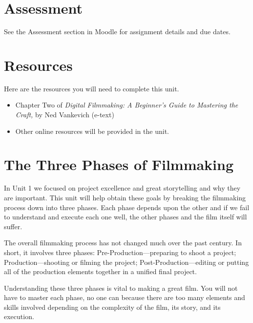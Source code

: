 \documentclass[
]{book}
\providecommand{\tightlist}{%
  \setlength{\itemsep}{0pt}\setlength{\parskip}{0pt}}
\begin{document}
\hypertarget{assessment-2}{%
\section*{Assessment}\label{assessment-2}}

See the Assessment section in Moodle for assignment details and due dates.

\hypertarget{resources-1}{%
\section*{Resources}\label{resources-1}}

Here are the resources you will need to complete this unit.

\begin{itemize}
\tightlist
\item
  Chapter Two of \emph{Digital Filmmaking: A Beginner's Guide to Mastering the Craft,} by Ned Vankevich (e-text)
\item
  Other online resources will be provided in the unit.
\end{itemize}

\hypertarget{the-three-phases-of-filmmaking}{%
\section{The Three Phases of Filmmaking}\label{the-three-phases-of-filmmaking}}

In Unit 1 we focused on project excellence and great storytelling and why they are important. This unit will help obtain these goals by breaking the filmmaking process down into three phases. Each phase depends upon the other and if we fail to understand and execute each one well, the other phases and the film itself will suffer.

The overall filmmaking process has not changed much over the past century. In short, it involves three phases: Pre-Production---preparing to shoot a project; Production---shooting or filming the project; Post-Production---editing or putting all of the production elements together in a unified final project.

Understanding these three phases is vital to making a great film. You will not have to master each phase, no one can because there are too many elements and skills involved depending on the complexity of the film, its story, and its execution.
\end{document}
